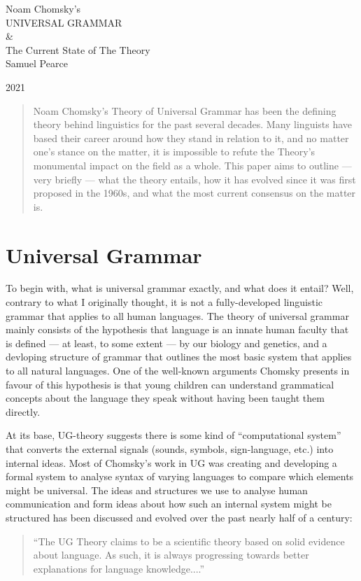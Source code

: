 \documentclass[a4paper,10pt]{article}
\begin{document}
\begingroup%
\centering
\vfill
\Huge{Noam Chomsky's}\\[0.5\baselineskip]
\Huge {UNIVERSAL GRAMMAR}\\
\Huge{\&}\\
\Huge{The Current State of The Theory}\\[\baselineskip]
\Large {Samuel Pearce}\par
\large{\scshape 2021}\par
\vfill\null
\endgroup

\begin{abstract}
    Noam Chomsky's Theory of Universal Grammar has been the defining
    theory behind linguistics for the past several decades. Many
    linguists have based their career around how they stand in relation
    to it, and no matter one's stance on the matter, it is impossible
    to refute the Theory's monumental impact on the field as a whole.
    This paper aims to outline --- very briefly --- what the theory
    entails, how it has evolved since it was first proposed in the
    1960s, and what the most current consensus on the matter is.
\end{abstract}

\pagebreak


\tableofcontents
\pagebreak


\section{Universal Grammar}
To begin with, what is universal grammar exactly, and what does it entail? Well, contrary to what
I originally thought, it is not a fully-developed linguistic grammar that applies to all human languages.
The theory of universal grammar mainly consists of the hypothesis that language is an innate human
faculty that is defined --- at least, to some extent --- by our biology and genetics, and a devloping
structure of grammar that outlines the most basic system that applies to all natural languages. One of the
well-known arguments Chomsky presents in favour of this hypothesis is that young children can
understand grammatical concepts about the language they speak without having been taught them
directly.\citep[p.~26]{ChUGAI}

At its base, UG-theory suggests there is some kind of ``computational system'' that converts the
external signals (sounds, symbols, sign-language, etc.) into internal ideas. \citep[p.~5]{ChUGAI}
Most of Chomsky's work in UG was creating and developing a formal system
to analyse syntax of varying languages to compare which elements might be universal. The ideas
and structures we use to analyse human communication and form ideas about how such an internal
system might be structured has been discussed and evolved over the past nearly half of a century:
\begin{quote}
	``The UG Theory claims to be a scientific theory based on solid evidence about language.
	As such, it is always progressing towards better explanations for language knowledge....''
	
	\citep[p.~27]{ChUGAI}
\end{quote}
\end{document}
